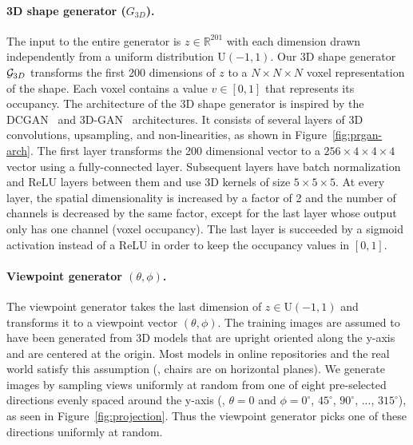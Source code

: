 \paragraph{3D shape generator ($G_{3D}$).}
The input to the entire generator is $z \in \mathbb{R}^{201}$ with
each dimension drawn independently from a uniform distribution
$\text{U}(-1,1)$.
Our 3D shape generator ${\cal G}_{3D}$ transforms the first 200 dimensions of $z$ to a
$N\times N \times N$ voxel representation of the shape.
Each voxel contains a value $v\in[0, 1]$ that represents its occupancy.
The architecture of the 3D shape generator is inspired by the
DCGAN~\cite{radford2015unsupervised} and 3D-GAN~\cite{wu2016learning}
architectures. 
It consists of several layers of 3D convolutions, upsampling, and
non-linearities, as shown in Figure~\ref{fig:prgan-arch}.
The first layer transforms the 200 dimensional vector to a $256\times
4 \times 4 \times 4$ vector using a fully-connected layer.
Subsequent layers have batch normalization and ReLU layers between them
and use 3D kernels of size $5\times5\times5$.
At every layer, the spatial dimensionality is increased by a factor of 2 and
the number of channels is decreased by the same factor, except for the last layer whose
output only has one channel (voxel occupancy).
The last layer is succeeded by a sigmoid activation instead of a ReLU in order
to keep the occupancy values in $[0,1]$.

\paragraph{Viewpoint generator $(\theta,\phi)$.}
The viewpoint generator takes the last dimension of $z \in
\text{U}(-1,1)$ and transforms it to a viewpoint vector
$(\theta,\phi)$.
The training images are assumed to have been generated from 3D models
that are upright oriented along the y-axis and are centered at the
origin.
Most models in online repositories and the real world satisfy this
assumption (\eg, chairs are on horizontal planes).
We generate images by sampling views uniformly at random from one of
eight pre-selected directions evenly spaced around the y-axis (\ie,
$\theta=0$ and $\phi=0^\circ$, $45^\circ$, $90^\circ$, $...$, $315^\circ$), as seen
in Figure~\ref{fig:projection}.
Thus the viewpoint generator picks one of these directions uniformly
at random.


